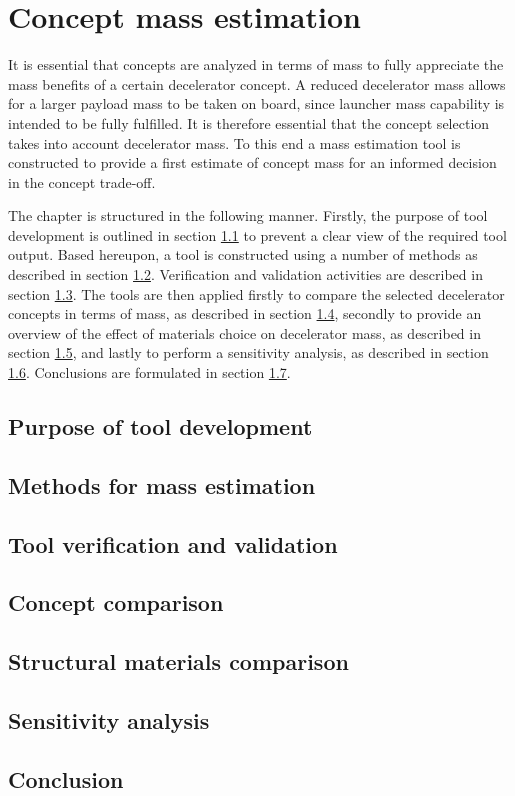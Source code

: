 \section{Concept mass estimation} \label{ch:strucmass}
It is essential that concepts are analyzed in terms of mass to fully appreciate the mass benefits of a certain decelerator concept. A reduced decelerator mass allows for a larger payload mass to be taken on board, since launcher mass capability is intended to be fully fulfilled. It is therefore essential that the concept selection takes into account decelerator mass. To this end a mass estimation tool is constructed to provide a first estimate of concept mass for an informed decision in the concept trade-off.

The chapter is structured in the following manner. Firstly, the purpose of tool development is outlined in section \ref{sec:strucpurp} to prevent a clear view of the required tool output. Based hereupon, a tool is constructed using a number of methods as described in section \ref{sec:strucmeth}. Verification and validation activities are described in section \ref{sec:strucvv}. The tools are then applied firstly to compare the selected decelerator concepts in terms of mass, as described in section \ref{sec:struccc}, secondly to provide an overview of the effect of materials choice on decelerator mass, as described in section \ref{sec:strucmat}, and lastly to perform a sensitivity analysis, as described in section \ref{sec:strucsens}. Conclusions are formulated in section \ref{sec:strucconc}.

\subsection{Purpose of tool development}\label{sec:strucpurp}

\subsection{Methods for mass estimation}\label{sec:strucmeth}

\subsection{Tool verification and validation}\label{sec:strucvv}

\subsection{Concept comparison}\label{sec:struccc}

\subsection{Structural materials comparison}\label{sec:strucmat}


\subsection{Sensitivity analysis}\label{sec:strucsens}

\subsection{Conclusion}\label{sec:strucconc}

